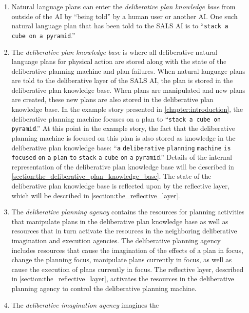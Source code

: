 \begin{enumerate}[~~A.]
\item Natural language plans can enter the {\emph{deliberative plan
    knowledge base}} from outside of the AI by ``being told'' by a
  human user or another AI.  One such natural language plan that has
  been told to the SALS AI is to ``{\tt{stack a cube on a pyramid}}.''
\item The {\emph{deliberative plan knowledge base}} is where all
  deliberative natural language plans for physical action are stored
  along with the state of the deliberative planning machine and plan
  failures.  When natural language plans are told to the deliberative
  layer of the SALS AI, the plan is stored in the deliberative plan
  knowledge base.  When plans are manipulated and new plans are
  created, these new plans are also stored in the deliberative plan
  knowledge base.  In the example story presented in
  {\mbox{\autoref{chapter:introduction}}}, the deliberative planning
  machine focuses on a plan to ``{\tt{stack a cube on pyramid}}.''  At
  this point in the example story, the fact that the deliberative
  planning machine is focused on this plan is also stored as knowledge
  in the deliberative plan knowledge base: ``{\tt{a}}
  {\tt{deliberative}} {\tt{planning}} {\tt{machine}} {\tt{is}}
  {\tt{focused}} {\tt{on}} {\tt{a}} {\tt{plan}} {\tt{to}} {\tt{stack}}
  {\tt{a}} {\tt{cube}} {\tt{on}} {\tt{a}} {\tt{pyramid}}.''  Details
  of the internal representation of the deliberative plan knowledge
  base will be described in
  {\mbox{\autoref{section:the_deliberative_plan_knowledge_base}}}.
  The state of the deliberative plan knowledge base is reflected upon
  by the reflective layer, which will be described in
  {\mbox{\autoref{section:the_reflective_layer}}}.
\item The {\emph{deliberative planning agency}} contains the resources
  for planning activities that manipulate plans in the deliberative
  plan knowledge base as well as resources that in turn activate the
  resources in the neighboring deliberative imagination and execution
  agencies.  The deliberative planning agency includes resources that
  cause the imagination of the effects of a plan in focus, change the
  planning focus, manipulate plans currently in focus, as well as
  cause the execution of plans currently in focus.  The reflective
  layer, described in {\mbox{\autoref{section:the_reflective_layer}}},
  activates the resources in the deliberative planning agency to
  control the deliberative planning machine.
\item The {\emph{deliberative imagination agency}} imagines the

\end{enumerate}
